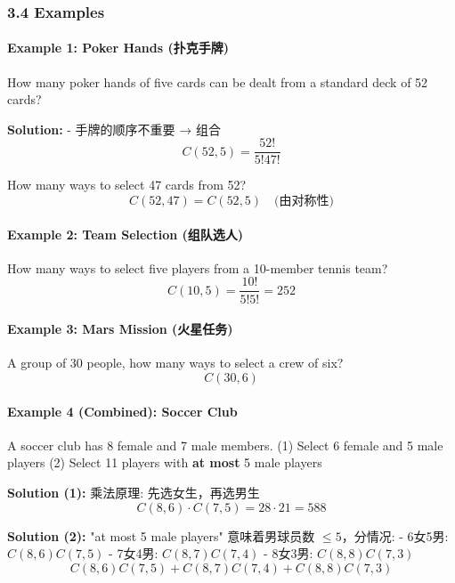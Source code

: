\documentclass[10pt,a4paper,openany]{ctexbook}
\theoremstyle{definition}
\theoremstyle{remark}
\renewenvironment{quote}
  {\list{}{\leftmargin=1em\rightmargin=0pt\topsep=0.5pt\partopsep=0pt}\item[]}
  {\endlist}
\begin{document}
\subsubsection{3.4 Examples}

\paragraph{Example 1: Poker Hands (扑克手牌)}

\begin{quote}
How many poker hands of five cards can be dealt from a standard deck of 52 cards?

\textbf{Solution:}
- 手牌的顺序不重要 → 组合
\[
C(52, 5) = \frac{52!}{5!47!}
\]


How many ways to select 47 cards from 52?
\[
C(52, 47) = C(52, 5) \quad\text{(由对称性)}
\]


\end{quote}

\paragraph{Example 2: Team Selection (组队选人)}

\begin{quote}
How many ways to select five players from a 10-member tennis team?
\[
C(10, 5) = \frac{10!}{5!5!} = 252
\]


\end{quote}

\paragraph{Example 3: Mars Mission (火星任务)}

\begin{quote}
A group of 30 people, how many ways to select a crew of six?
\[
C(30, 6)
\]


\end{quote}

\paragraph{Example 4 (Combined): Soccer Club}

\begin{quote}
A soccer club has 8 female and 7 male members.
(1) Select 6 female and 5 male players
(2) Select 11 players with \textbf{at most} 5 male players

\textbf{Solution (1):}
乘法原理: 先选女生，再选男生
\[
C(8, 6) \cdot C(7, 5) = 28 \cdot 21 = 588
\]


\textbf{Solution (2):}
"at most 5 male players" 意味着男球员数 $\le 5$，分情况:
- 6女5男: $C(8,6)C(7,5)$
- 7女4男: $C(8,7)C(7,4)$
- 8女3男: $C(8,8)C(7,3)$
\[
C(8,6)C(7,5) + C(8,7)C(7,4) + C(8,8)C(7,3)
\]


\end{quote}
\vspace{-2pt}
\end{document}
